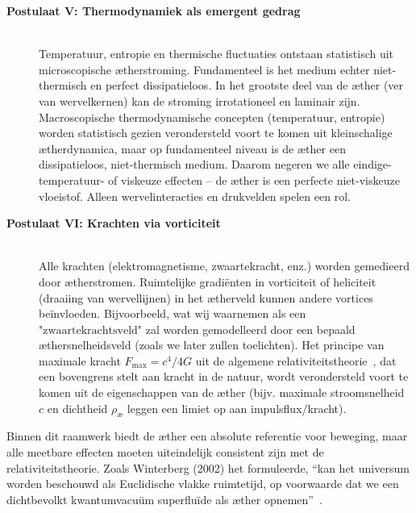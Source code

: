 \begin{description}
    \item[\textbf{Postulaat V: Thermodynamiek als emergent gedrag}] \hfill \\
    Temperatuur, entropie en thermische fluctuaties ontstaan statistisch uit microscopische ætherstroming. Fundamenteel is het medium echter niet-thermisch en perfect dissipatieloos. In het grootste deel van de æther (ver van wervelkernen) kan de stroming irrotationeel en laminair zijn. Macroscopische thermodynamische concepten (temperatuur, entropie) worden statistisch gezien verondersteld voort te komen uit kleinschalige ætherdynamica, maar op fundamenteel niveau is de æther een dissipatieloos, niet-thermisch medium. Daarom negeren we alle eindige-temperatuur- of viskeuze effecten – de æther is een perfecte niet-viskeuze vloeistof. Alleen wervelinteracties en drukvelden spelen een rol.

    \item[\textbf{Postulaat VI: Krachten via vorticiteit}] \hfill \\
    Alle krachten (elektromagnetisme, zwaartekracht, enz.) worden gemedieerd door ætherstromen.
    Ruimtelijke gradiënten in vorticiteit of heliciteit (draaiing van wervellijnen) in het ætherveld kunnen andere vortices beïnvloeden. Bijvoorbeeld, wat wij waarnemen als een $\text{"zwaartekrachtsveld"}$ zal worden gemodelleerd door een bepaald æthersnelheidsveld (zoals we later zullen toelichten). Het principe van maximale kracht $ F_\text{max} = c^4 / 4 G $ uit de algemene relativiteitstheorie~\cite{Schiller2022-maxforce}, dat een bovengrens stelt aan kracht in de natuur, wordt verondersteld voort te komen uit de eigenschappen van de æther (bijv. maximale stroomsnelheid $c$ en dichtheid $\rho_\text{\ae}$ leggen een limiet op aan impulsflux/kracht).
\end{description}



Binnen dit raamwerk biedt de æther een absolute referentie voor beweging, maar alle meetbare effecten moeten uiteindelijk consistent zijn met de relativiteitstheorie. Zoals Winterberg (2002) het formuleerde, ``kan het universum worden beschouwd als Euclidische vlakke ruimtetijd, op voorwaarde dat we een dichtbevolkt kwantumvacuüm superfluïde als æther opnemen''~\cite{Winterberg2002-PlanckAether}.


